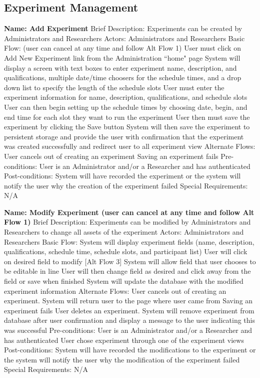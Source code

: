 \subsection{Experiment Management}
\begin{outline}[enumerate]

\1 {\bf Name: Add Experiment}
\2 Brief Description: Experiments can be created by Administrators and Researchers
\2 Actors: Administrators and Researchers
\2 Basic Flow: (user can cancel at any time and follow Alt Flow 1)
\3 User must click on Add New Experiment link from the Administration ``home" page
\3 System will display a screen with text boxes to enter experiment name, description,  and qualifications, multiple date/time choosers for the schedule times, and a drop down list to specify the length of the schedule slots
\3 User must enter the experiment information for name, description, qualifications, and schedule slots
\3 User can then begin setting up the schedule times by choosing date, begin, and end time for each slot they want to run the experiment
\3 User then must save the experiment by clicking the Save button
\3 System will then save the experiment to persistent storage and provide the user with confirmation that the experiment was created successfully and redirect user to all experiment view
\2 Alternate Flows:
\3 User cancels out of creating an experiment
\3 Saving an experiment fails
\2 Pre-conditions:
\3 User is an Administrator and/or a Researcher and has authenticated
\2 Post-conditions:
\3 System will have recorded the experiment or the system will notify the user why the creation of the experiment failed
\2 Special Requirements:
\3 N/A

\1 {\bf Name: Modify Experiment (user can cancel at any time and follow Alt Flow 1)}
\2 Brief Description: Experiments can be modified by Administrators and Researchers to change all assets of the experiment
\2 Actors: Administrators and Researchers
\2 Basic Flow:
\3 System will display experiment fields (name, description, qualifications, schedule time, schedule slots, and participant list)
\3 User will click on desired field to modify [Alt Flow 3]
\3 System will allow field that user chooses to be editable in line
\3 User will then change field as desired and click away from the field or save when finished
\3 System will update the database with the modified experiment information
\2 Alternate Flows:
\3 User cancels out of creating an experiment. System will return user to the page where user came from
\3 Saving an experiment fails
\3 User deletes an experiment. System will remove experiment from database after user confirmation and display a message to the user indicating this was successful
\2 Pre-conditions:
\3 User is an Administrator and/or a Researcher and has authenticated
\3 User chose experiment through one of the experiment views
\2 Post-conditions:
\3 System will have recorded the modifications to the experiment or the system will notify the user why the modification of the experiment failed
\2 Special Requirements:
\3 N/A

\end{outline}
